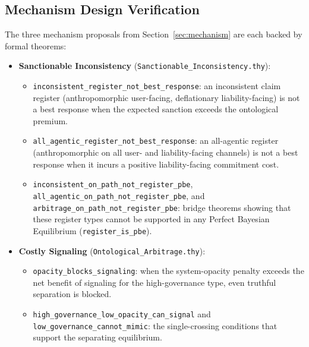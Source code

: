\documentclass[review,authoryear]{elsarticle}
\theoremstyle{definition}
\theoremstyle{plain}
\begin{document}
\subsection*{Mechanism Design Verification}

The three mechanism proposals from Section~\ref{sec:mechanism} are each backed by formal theorems:
\begin{itemize}\sloppy
    \item \textbf{Sanctionable Inconsistency} (\texttt{Sanctionable\_\allowbreak{}Inconsistency.thy}):
      \begin{itemize}
        \item \texttt{inconsistent\_\allowbreak{}register\_\allowbreak{}not\_\allowbreak{}best\_\allowbreak{}response}: an inconsistent claim register (anthropomorphic user-facing, deflationary liability-facing) is not a best response when the expected sanction exceeds the ontological premium.
        \item \texttt{all\_\allowbreak{}agentic\_\allowbreak{}register\_\allowbreak{}not\_\allowbreak{}best\_\allowbreak{}response}: an all-agentic register (anthropomorphic on all user- and liability-facing channels) is not a best response when it incurs a positive liability-facing commitment cost.
        \item \texttt{inconsistent\_\allowbreak{}on\_\allowbreak{}path\_\allowbreak{}not\_\allowbreak{}register\_\allowbreak{}pbe}, \texttt{all\_\allowbreak{}agentic\_\allowbreak{}on\_\allowbreak{}path\_\allowbreak{}not\_\allowbreak{}register\_\allowbreak{}pbe}, and \texttt{arbitrage\_\allowbreak{}on\_\allowbreak{}path\_\allowbreak{}not\_\allowbreak{}register\_\allowbreak{}pbe}: bridge theorems showing that these register types cannot be supported in any Perfect Bayesian Equilibrium (\texttt{register\_\allowbreak{}is\_\allowbreak{}pbe}).
      \end{itemize}
    \item \textbf{Costly Signaling} (\texttt{Ontological\_\allowbreak{}Arbitrage.thy}):
      \begin{itemize}
        \item \texttt{opacity\_\allowbreak{}blocks\_\allowbreak{}signaling}: when the system-opacity penalty exceeds the net benefit of signaling for the high-governance type, even truthful separation is blocked.
        \item \texttt{high\_\allowbreak{}governance\_\allowbreak{}low\_\allowbreak{}opacity\_\allowbreak{}can\_\allowbreak{}signal} and \texttt{low\_\allowbreak{}governance\_\allowbreak{}cannot\_\allowbreak{}mimic}: the single-crossing conditions that support the separating equilibrium.

\end{itemize}
\end{itemize}
\end{document}
